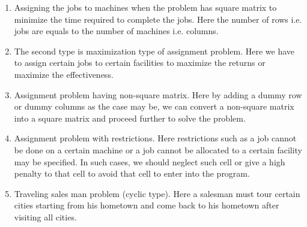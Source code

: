 \begin{enumerate}
	\item Assigning the jobs to machines when the problem has square matrix to minimize the time required to complete the jobs. Here the number of rows i.e. jobs are equals to the number of machines i.e. columns.
	\item The second type is maximization type of assignment problem. Here we have to assign certain jobs to certain facilities to maximize the returns or maximize the effectiveness.
	\item Assignment problem having non-square matrix. Here by adding a dummy row or dummy columns as the case may be, we can convert a non-square matrix into a square matrix and proceed further to solve the problem.
	\item Assignment problem with restrictions. Here restrictions such as a job cannot be done on a certain machine or a job cannot be allocated to a certain facility may be specified. In such cases, we should neglect such cell or give a high penalty to that cell to avoid that cell to enter into the program.
	\item Traveling sales man problem (cyclic type). Here a salesman must tour certain cities starting from his hometown and come back to his hometown after visiting all cities.
\end{enumerate}
